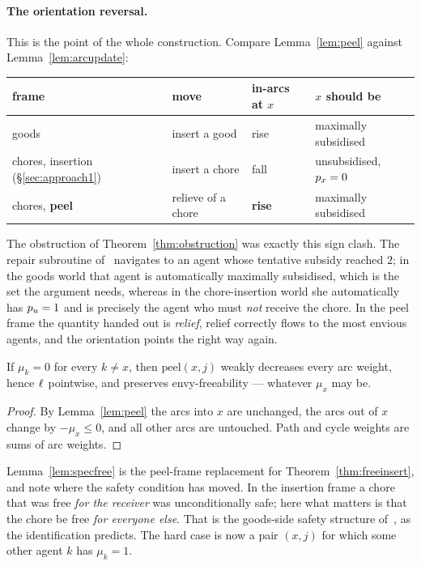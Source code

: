 \paragraph{The orientation reversal.}
This is the point of the whole construction. Compare
Lemma~\ref{lem:peel} against Lemma~\ref{lem:arcupdate}:

\begin{center}
\begin{tabular}{@{}llll@{}}
\toprule
frame & move & in-arcs at $x$ & $x$ should be \\
\midrule
goods~\cite{BKNS22}      & insert a good   & rise          & maximally subsidised \\
chores, insertion (\S\ref{sec:approach1}) & insert a chore  & fall          & unsubsidised, $p_x = 0$ \\
chores, \textbf{peel}    & relieve of a chore & \textbf{rise} & maximally subsidised \\
\bottomrule
\end{tabular}
\end{center}

The obstruction of Theorem~\ref{thm:obstruction} was exactly this sign clash.
The repair subroutine of~\cite{BKNS22} navigates to an agent whose tentative
subsidy reached $2$; in the goods world that agent is automatically maximally
subsidised, which is the set the argument needs, whereas in the chore-insertion
world she automatically has $p_u = 1$ and is precisely the agent who must
\emph{not} receive the chore. In the peel frame the quantity handed out is
\emph{relief}, relief correctly flows to the most envious agents, and the
orientation points the right way again.

\begin{lemma}
\label{lem:specfree}
If $\mu_k = 0$ for every $k \ne x$, then $\mathrm{peel}(x,j)$ weakly decreases
every arc weight, hence $\ell_{}$ pointwise, and preserves envy-freeability ---
whatever $\mu_x$ may be.
\end{lemma}

\begin{proof}
By Lemma~\ref{lem:peel} the arcs into $x$ are unchanged, the arcs out of $x$
change by $-\mu_x \le 0$, and all other arcs are untouched. Path and cycle
weights are sums of arc weights.
\end{proof}

Lemma~\ref{lem:specfree} is the peel-frame replacement for
Theorem~\ref{thm:freeinsert}, and note where the safety condition has moved. In
the insertion frame a chore that was free \emph{for the receiver} was
unconditionally safe; here what matters is that the chore be free \emph{for
everyone else}. That is the goods-side safety structure of~\cite{BKNS22}, as the
identification predicts. The hard case is now a pair $(x,j)$ for which some
other agent $k$ has $\mu_k = 1$.

